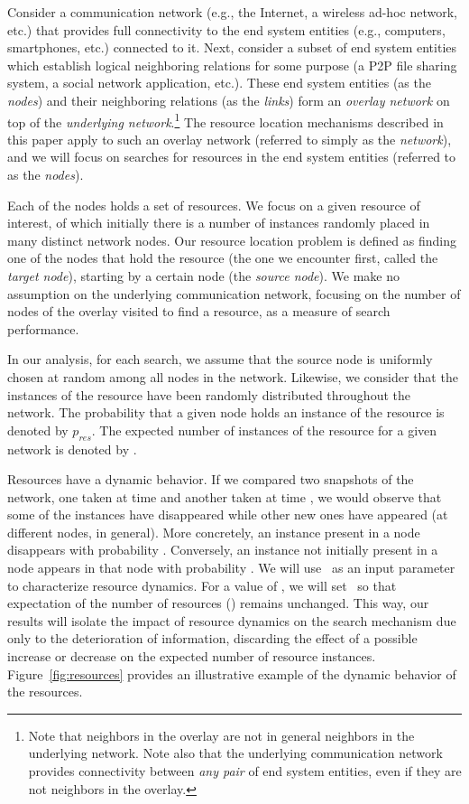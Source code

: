 \documentclass[]{elsarticle}
\newcommand{\pnoderes}  {\ensuremath{p_{res}}}
\begin{document}
Consider a communication network (e.g., the Internet, a wireless ad-hoc network, etc.) that provides full connectivity to the end system entities (e.g., computers, smartphones, etc.) connected to it. Next, consider a subset of  end system entities which establish logical neighboring relations for some purpose (a P2P file sharing system, a social network application, etc.). These end system entities (as the \emph{nodes}) and their neighboring relations (as the \emph{links}) form an \emph{overlay network} on top of the \emph{underlying network}.\footnote{Note that neighbors in the overlay are not in general neighbors in the underlying network. Note also that the underlying communication network provides connectivity between \emph{any pair} of end system entities, even if they are not neighbors in the overlay.}
The resource location mechanisms described in this paper apply to such an overlay network (referred to simply as the \emph{network}), and we will focus on searches for resources in the end system entities (referred to as the \emph{nodes}).




Each of the  nodes holds a set of resources. We focus on a given resource of interest, of which initially there is a number of instances randomly placed in many distinct network nodes. Our resource location problem is defined as finding one of the nodes that hold the resource (the one we encounter first, called the \emph{target node}), starting by a certain node (the \emph{source node}). We make no assumption on the underlying communication network, focusing on the number of nodes of the overlay visited to find a resource, as a measure of search performance.

In our analysis, for each search, we assume that the source node is uniformly chosen at random among all nodes in the network. Likewise, we consider that the instances of the resource have been randomly distributed throughout the network. The probability that a given node holds an instance of the resource is denoted by \pnoderes. The expected number of instances of the resource for a given network is denoted by .

Resources have a dynamic behavior. If we compared two snapshots of the network, one taken at time  and another taken at time , we would observe that some of the instances have disappeared while other new ones have appeared (at different nodes, in general).
More concretely, an instance present in a node disappears with probability \pd. Conversely, an instance not initially present in a node appears in that node with probability \pa. We will use \pd\ as an input parameter to characterize resource dynamics. For a value of \pd, we will set \pa\ so that expectation of the number of resources (\R) remains unchanged. This way, our results will isolate the impact of resource dynamics on the search mechanism due only to the deterioration of information, discarding the effect of a possible increase or decrease on the expected number of resource instances. Figure~\ref{fig:resources} provides an illustrative example of the dynamic behavior of the resources.
\end{document}
